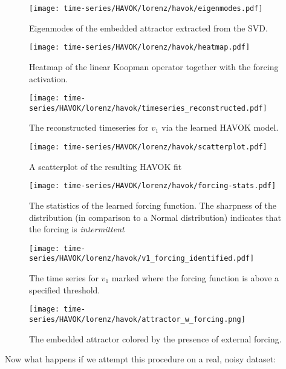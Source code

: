 \begin{figure}[h]
  \centering
  \texttt{[image: time-series/HAVOK/lorenz/havok/eigenmodes.pdf]}
  \caption{Eigenmodes of the embedded attractor extracted from the SVD.}
\end{figure}

\begin{figure}[h]
  \centering
  \texttt{[image: time-series/HAVOK/lorenz/havok/heatmap.pdf]}
  \caption{Heatmap of the linear Koopman operator together with the forcing activation.}
\end{figure}

\begin{figure}[h]
  \centering
  \texttt{[image: time-series/HAVOK/lorenz/havok/timeseries\_reconstructed.pdf]}
  \caption{The reconstructed timeseries for $v_1$ via the learned HAVOK model.}
\end{figure}

\begin{figure}[h]
  \centering
  \texttt{[image: time-series/HAVOK/lorenz/havok/scatterplot.pdf]}
  \caption{A scatterplot of the resulting HAVOK fit}
\end{figure}

\begin{figure}[h]
  \centering
  \texttt{[image: time-series/HAVOK/lorenz/havok/forcing-stats.pdf]}
  \caption{The statistics of the learned forcing function. The sharpness of the distribution (in comparison to a Normal distribution) indicates that the forcing is \textit{intermittent}}
\end{figure}

\begin{figure}[h]
  \centering
  \texttt{[image: time-series/HAVOK/lorenz/havok/v1\_forcing\_identified.pdf]}
  \caption{The time series for $v_1$ marked where the forcing function is above a specified threshold.}
\end{figure}


\begin{figure}[h]
  \centering
  \texttt{[image: time-series/HAVOK/lorenz/havok/attractor\_w\_forcing.png]}
  \caption{The embedded attractor colored by the presence of external forcing.}
\end{figure}

Now what happens if we attempt this procedure on a real, noisy dataset:



